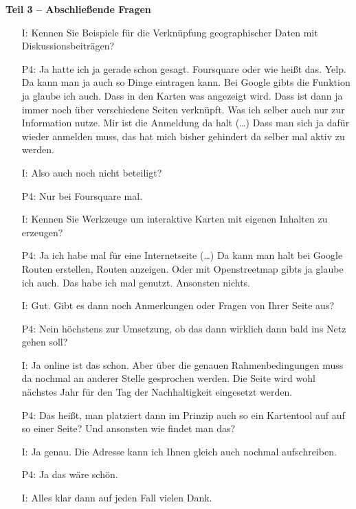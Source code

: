 \textbf{Teil 3 -- Abschlie{\ss}ende Fragen}
\begin{itemize}
    \item[I:] Kennen Sie Beispiele f{\"u}r die Verkn{\"u}pfung geographischer Daten mit Diskussionsbeitr{\"a}gen?
    \item[P4:] Ja hatte ich ja gerade schon gesagt. Foursquare oder wie hei{\ss}t das. Yelp. Da kann man ja auch so Dinge eintragen kann. Bei Google gibts die Funktion ja glaube ich auch. Dass in den Karten was angezeigt wird. Dass ist dann ja immer noch {\"u}ber verschiedene Seiten verkn{\"u}pft. Was ich selber auch nur zur Information nutze. Mir ist die Anmeldung da halt (\dots) Dass man sich ja daf{\"u}r wieder anmelden muss, das hat mich bisher gehindert da selber mal aktiv zu werden.
    \item[I:] Also auch noch nicht beteiligt?
    \item[P4:] Nur bei Foursquare mal.
    \item[I:] Kennen Sie Werkzeuge um interaktive Karten mit eigenen Inhalten zu erzeugen?
    \item[P4:] Ja ich habe mal f{\"u}r eine Internetseite (\dots) Da kann man halt bei Google Routen erstellen, Routen anzeigen. Oder mit Openstreetmap gibts ja glaube ich auch. Das habe ich mal genutzt. Ansonsten nichts.
    \item[I:] Gut. Gibt es dann noch Anmerkungen oder Fragen von Ihrer Seite aus?
    \item[P4:] Nein h{\"o}chstens zur Umsetzung, ob das dann wirklich dann bald ins Netz gehen soll?
    \item[I:] Ja online ist das schon. Aber {\"u}ber die genauen Rahmenbedingungen muss da nochmal an anderer Stelle gesprochen werden. Die Seite wird wohl n{\"a}chstes Jahr f{\"u}r den Tag der Nachhaltigkeit eingesetzt werden.
    \item[P4:] Das hei{\ss}t, man platziert dann im Prinzip auch so ein Kartentool auf auf so einer Seite? Und ansonsten wie findet man das?
    \item[I:] Ja genau. Die Adresse kann ich Ihnen gleich auch nochmal aufschreiben.
    \item[P4:] Ja das w{\"a}re sch{\"o}n.
    \item[I:] Alles klar dann auf jeden Fall vielen Dank.
\end{itemize}